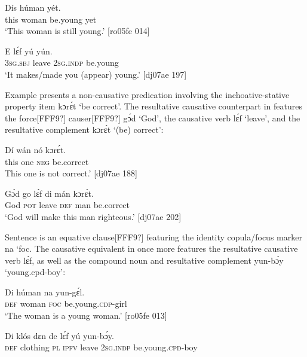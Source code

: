 \ea%
    \label{ex:key:1334}
    \gll Dís  húman        yét.\\
this  woman  be.young    yet\\

\glt ‘This woman is still young.’ [ro05fe 014]
\z


\ea%
    \label{ex:key:1335}
    \gll E    lɛ́f    yú    yún.\\
\textsc{3sg.sbj}  leave  \textsc{2sg.indp}  be.young\\

\glt ‘It makes/made you (appear) young.’ [dj07ae 197]
\z

Example  presents a non-causative predication involving the inchoative-stative property item kɔrɛ́t ‘be correct’. The resultative causative counterpart in  features the force[FFF9?] causer[FFF9?] gɔ́d ‘God’, the causative verb lɛ́f ‘leave’, and the resultative complement kɔrɛ́t ‘(be) correct’:


\ea%
    \label{ex:key:1336}
    \gll Dí  wán    nó  kɔrɛ́t.\\
this  one    \textsc{neg}  be.correct\\

\glt This one is not correct.’ [dj07ae 188]
\z


\ea%
    \label{ex:key:1337}
    \gll Gɔ́d  go  lɛ́f    di  mán    kɔrɛ́t.\\
God  \textsc{pot}  leave  \textsc{def}  man    be.correct\\

\glt ‘God will make this man righteous.’ [dj07ae 202]
\z

Sentence  is an equative clause[FFF9?] featuring the identity copula/focus marker na ‘foc. The causative equivalent in  once more features the resultative causative verb lɛ́f, as well as the compound noun and resultative complement yun-bɔ́y ‘young.cpd-boy’:


\ea%
    \label{ex:key:1338}
    \gll Di  húman  na  yun-gɛ́l.\\
\textsc{def}  woman  \textsc{foc}  be.young.\textsc{cdp}{}-girl\\

\glt ‘The woman is a young woman.’ [ro05fe 013]
\z


\ea%
    \label{ex:key:1339}
    \gll Di  klós    dɛn  de  lɛ́f    yú    yun-bɔ́y.\\
\textsc{def}  clothing  \textsc{pl}  \textsc{ipfv}  leave  \textsc{2sg.indp}  be.young\textsc{.cpd}{}-boy\\

